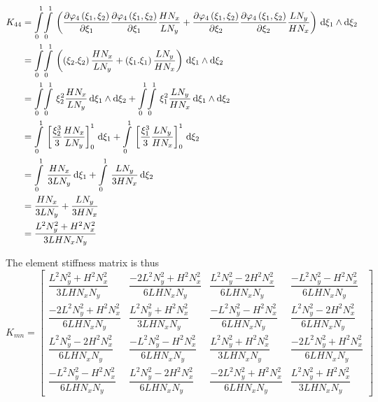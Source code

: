 \begin{equation}
  \begin{aligned}
    K_{44}&=\giint{0}{1}{0}{1}{\pbrac{\delby{\lbfn{4}{\xi_{1},\xi_{2}}}{\xi_{1}}\delby{\lbfn{4}{\xi_{1},\xi_{2}}}{\xi_{1}}
        \dfrac{H N_{x}}{L N_{y}}+\delby{\lbfn{4}{\xi_{1},\xi_{2}}}{\xi_{2}}\delby{\lbfn{4}{\xi_{1},\xi_{2}}}{\xi_{2}}
        \dfrac{L N_{y}}{H N_{x}}}}{\xi_{1}}{\xi_{2}}\\
    &=\giint{0}{1}{0}{1}{\pbrac{\pbrac{\xi_{2}.\xi_{2}}\dfrac{H N_{x}}{L N_{y}}+
    \pbrac{\xi_{1}.\xi_{1}}\dfrac{L N_{y}}{H N_{x}}}}{\xi_{1}}{\xi_{2}} \\
    &=\giint{0}{1}{0}{1}{\xi_{2}^{2}\dfrac{H N_{x}}{L N_{y}}}{\xi_{1}}{\xi_{2}}+
    \giint{0}{1}{0}{1}{\xi_{1}^{2}\dfrac{L N_{y}}{H N_{x}}}{\xi_{1}}{\xi_{2}} \\
    &=\gint{0}{1}{\sqbrac{\dfrac{\xi_{2}^{3}}{3}\dfrac{H N_{x}}{L N_{y}}}_{0}^{1}}{\xi_{1}}+
    \gint{0}{1}{\sqbrac{\dfrac{\xi_{1}^{3}}{3}\dfrac{L N_{y}}{H N_{x}}}_{0}^{1}}{\xi_{2}} \\
    &=\gint{0}{1}{\dfrac{H N_{x}}{3 L N_{y}}}{\xi_{1}}+\gint{0}{1}{\dfrac{L N_{y}}{3 H N_{x}}}{\xi_{2}} \\
    &=\dfrac{H N_{x}}{3 L N_{y}}+\dfrac{L N_{y}}{3 H N_{x}} \\
    &=\dfrac{L^{2}N_{y}^{2}+H^{2}N_{x}^{2}}{3 L H N_{x} N_{y}}
  \end{aligned}
\end{equation}

The element stiffness matrix is thus
\begin{equation}
  K_{mn}=\begin{bmatrix}
  \dfrac{L^{2}N_{y}^{2}+H^{2}N_{x}^{2}}{3 L H N_{x} N_{y}} & \dfrac{-2 L^{2}N_{y}^{2}+H^{2}N_{x}^{2}}{6 L H N_{x} N_{y}} &
  \dfrac{L^{2}N_{y}^{2}-2 H^{2}N_{x}^{2}}{6 L H N_{x} N_{y}} & \dfrac{-L^{2}N_{y}^{2}-H^{2}N_{x}^{2}}{6 L H N_{x} N_{y}} \\
  \dfrac{-2 L^{2}N_{y}^{2}+H^{2}N_{x}^{2}}{6 L H N_{x} N_{y}} & \dfrac{L^{2}N_{y}^{2}+H^{2}N_{x}^{2}}{3 L H N_{x} N_{y}} &
  \dfrac{-L^{2}N_{y}^{2}-H^{2}N_{x}^{2}}{6 L H N_{x} N_{y}} & \dfrac{L^{2}N_{y}^{2}-2 H^{2}N_{x}^{2}}{6 L H N_{x} N_{y}} \\
  \dfrac{L^{2}N_{y}^{2}-2 H^{2}N_{x}^{2}}{6 L H N_{x} N_{y}} & \dfrac{-L^{2}N_{y}^{2}-H^{2}N_{x}^{2}}{6 L H N_{x} N_{y}} &
  \dfrac{L^{2}N_{y}^{2}+H^{2}N_{x}^{2}}{3 L H N_{x} N_{y}} & \dfrac{-2 L^{2}N_{y}^{2}+H^{2}N_{x}^{2}}{6 L H N_{x} N_{y}} \\
  \dfrac{-L^{2}N_{y}^{2}-H^{2}N_{x}^{2}}{6 L H N_{x} N_{y}} & \dfrac{L^{2}N_{y}^{2}-2 H^{2}N_{x}^{2}}{6 L H N_{x} N_{y}} &
  \dfrac{-2 L^{2}N_{y}^{2}+H^{2}N_{x}^{2}}{6 L H N_{x} N_{y}} & \dfrac{L^{2}N_{y}^{2}+H^{2}N_{x}^{2}}{3 L H N_{x} N_{y}}
  \end{bmatrix}
  \label{eqn:FEMTwoDLaplaceElementStiffnessMatrix}
\end{equation}

